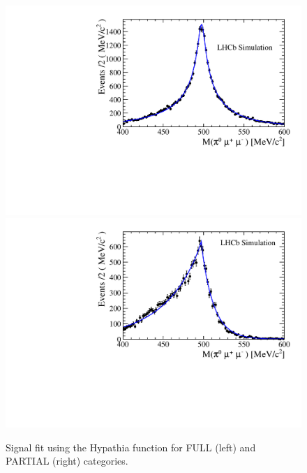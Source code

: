 \begin{figure} [htb!]
\begin{center}
\includegraphics[scale=0.30]{figs/Kspi0MuMu/Ipatia_pi0.pdf}
\includegraphics[scale=0.30]{figs/Kspi0MuMu/Ipatia_nopi0.pdf}
\caption{Signal fit using the Hypathia function for FULL (left) and PARTIAL (right) categories. \label{fig:Ipatia}}
\end{center}
\end{figure}


